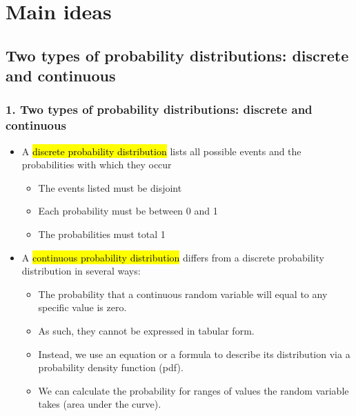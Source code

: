 \documentclass[slidestop,compress,mathserif,12pt,t,professionalfonts,xcolor=table]{beamer}
\begin{document}

\section{Main ideas}


\subsection{Two types of probability distributions: discrete and continuous}
\label{mi1}


\begin{frame}
\frametitle{1. Two types of probability distributions: discrete and continuous}

\begin{itemize}

\item A \hl{discrete probability distribution} lists all possible events and the probabilities with which they occur
\begin{itemize}
\item The events listed must be disjoint
\item Each probability must be between 0 and 1 
\item The probabilities must total 1
\end{itemize}

\pause

\item A \hl{continuous probability distribution} differs from a discrete probability distribution in several ways:
\begin{itemize}
\item The probability that a continuous random variable will equal to any specific value is zero.
\item As such, they cannot be expressed in tabular form.
\item Instead, we use an equation or a formula to describe its distribution via a probability density function (pdf).
\item We can calculate the probability for ranges of values the random variable takes (area under the curve).
\end{itemize}

\end{itemize}


\end{frame}
\end{document}
